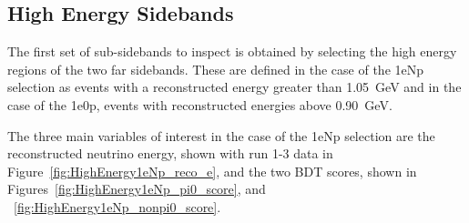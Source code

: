 \subsection{High Energy Sidebands}
\label{sec:HighEnergySidebands}

The first set of sub-sidebands to inspect is obtained by selecting the high energy regions of the two far sidebands. These are defined in the case of the 1eNp selection as events with a reconstructed energy greater than 1.05~GeV and in the case of the 1e0p, events with reconstructed energies above 0.90~GeV.

The three main variables of interest in the case of the 1eNp selection are the reconstructed neutrino energy, shown with run 1-3 data in Figure~\ref{fig:HighEnergy1eNp_reco_e}, and the two BDT scores, shown in Figures~\ref{fig:HighEnergy1eNp_pi0_score}, and ~\ref{fig:HighEnergy1eNp_nonpi0_score}.

